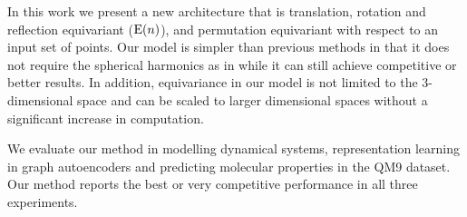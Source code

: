 


In this work we present a new architecture that is translation, rotation and reflection equivariant ($\mathrm{E}(n)$), and permutation equivariant with respect to an input set of points. Our model is simpler than previous methods in that it does not require the spherical harmonics as in \cite{thomas2018tensor, fuchs2020se} while it can still achieve competitive or better results. In addition, equivariance in our model is not limited to the 3-dimensional space and can be scaled to larger dimensional spaces without a significant increase in computation. 

We evaluate our method in modelling dynamical systems, representation learning in graph autoencoders and predicting molecular properties in the QM9 dataset. Our method reports the best or very competitive performance in all three experiments.